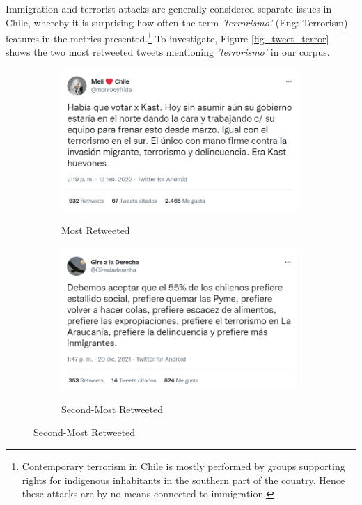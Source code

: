         Immigration and terrorist attacks are generally considered separate issues in Chile, whereby it is surprising how often the term {\it 'terrorismo'} (Eng: Terrorism) features in the metrics presented.\footnote{Contemporary terrorism in Chile is mostly performed by groups supporting rights for indigenous inhabitants in the southern part of the country. Hence these attacks are by no means connected to immigration.} To investigate, Figure \ref{fig_tweet_terror} shows the two most retweeted tweets mentioning {\it 'terrorismo'} in our corpus.
        
        \begin{figure}[H]
            \caption{Most Retweeted Tweets that Mention Terrorism}
            \label{fig_tweet_terror}
            
            \centering
                \begin{subfigure}{0.5\textwidth}
                    \caption{Most Retweeted}
                    \centering        
                    \includegraphics[width=.99\linewidth]{figs/tweet_terrorism_1.png}
                    \label{fig_tweet_terror_1}
                \end{subfigure}%
                \begin{subfigure}{0.5\textwidth}
                     \caption{Second-Most Retweeted}
                    \centering
                    \includegraphics[width=.99\linewidth]{figs/tweet_terrorism_2.png}
                    \label{fig_tweet_terror_2}
                \end{subfigure}
            \label{tweet_protest}
            

\end{figure}
